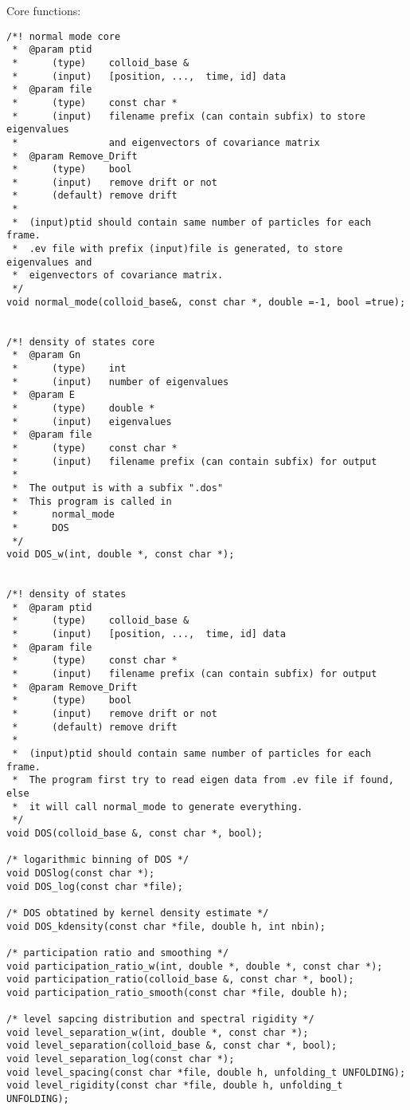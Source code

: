 Core functions:\\
\begin{verbatim}
/*! normal mode core 
 *  @param ptid
 *  	(type)    colloid_base &
 *  	(input)   [position, ...,  time, id] data
 *  @param file
 *  	(type)    const char *
 *  	(input)   filename prefix (can contain subfix) to store eigenvalues
 *  	          and eigenvectors of covariance matrix
 *  @param Remove_Drift
 *  	(type)    bool
 *  	(input)   remove drift or not
 *  	(default) remove drift
 *
 *  (input)ptid should contain same number of particles for each frame. 
 *  .ev file with prefix (input)file is generated, to store eigenvalues and
 *  eigenvectors of covariance matrix.
 */
void normal_mode(colloid_base&, const char *, double =-1, bool =true);


/*! density of states core 
 *  @param Gn
 *  	(type)    int
 *  	(input)   number of eigenvalues
 *  @param E
 *  	(type)    double *
 *  	(input)   eigenvalues
 *  @param file
 *  	(type)    const char *
 *  	(input)   filename prefix (can contain subfix) for output
 *
 *  The output is with a subfix ".dos"
 *  This program is called in
 *  	normal_mode
 *  	DOS
 */
void DOS_w(int, double *, const char *);


/*! density of states 
 *  @param ptid
 *  	(type)    colloid_base &
 *  	(input)   [position, ...,  time, id] data
 *  @param file
 *  	(type)    const char *
 *  	(input)   filename prefix (can contain subfix) for output
 *  @param Remove_Drift
 *  	(type)    bool
 *  	(input)   remove drift or not
 *  	(default) remove drift
 *
 *  (input)ptid should contain same number of particles for each frame. 
 *  The program first try to read eigen data from .ev file if found, else
 *  it will call normal_mode to generate everything.
 */
void DOS(colloid_base &, const char *, bool);

/* logarithmic binning of DOS */
void DOSlog(const char *);
void DOS_log(const char *file);

/* DOS obtatined by kernel density estimate */
void DOS_kdensity(const char *file, double h, int nbin);

/* participation ratio and smoothing */
void participation_ratio_w(int, double *, double *, const char *);
void participation_ratio(colloid_base &, const char *, bool);
void participation_ratio_smooth(const char *file, double h);

/* level sapcing distribution and spectral rigidity */
void level_separation_w(int, double *, const char *);
void level_separation(colloid_base &, const char *, bool);
void level_separation_log(const char *);
void level_spacing(const char *file, double h, unfolding_t UNFOLDING);
void level_rigidity(const char *file, double h, unfolding_t UNFOLDING);


\end{verbatim}
